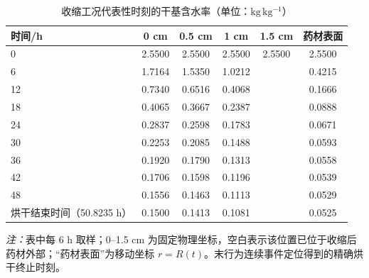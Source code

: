\begin{table}[htbp]
\centering
\caption{收缩工况代表性时刻的干基含水率（单位：$\mathrm{kg\,kg^{-1}}$）}
\label{tab:t6}
\begin{tabular}{lccccc}
\toprule
时间/h & 0 cm & 0.5 cm & 1 cm & 1.5 cm & 药材表面 \\
\midrule
0 & 2.5500 & 2.5500 & 2.5500 & 2.5500 & 2.5500 \\
6 & 1.7164 & 1.5350 & 1.0212 &  & 0.4215 \\
12 & 0.7340 & 0.6516 & 0.4068 &  & 0.1666 \\
18 & 0.4065 & 0.3667 & 0.2387 &  & 0.0888 \\
24 & 0.2837 & 0.2598 & 0.1783 &  & 0.0671 \\
30 & 0.2253 & 0.2085 & 0.1488 &  & 0.0593 \\
36 & 0.1920 & 0.1790 & 0.1313 &  & 0.0558 \\
42 & 0.1706 & 0.1598 & 0.1196 &  & 0.0539 \\
48 & 0.1556 & 0.1463 & 0.1113 &  & 0.0529 \\
烘干结束时间（50.8235 h） & 0.1500 & 0.1413 & 0.1081 &  & 0.0525 \\
\bottomrule
\end{tabular}
\parbox{0.88\linewidth}{\footnotesize\textit{注：}表中每 6 h 取样；0--1.5 cm 为固定物理坐标，空白表示该位置已位于收缩后药材外部；“药材表面”为移动坐标 $r=R(t)$。末行为连续事件定位得到的精确烘干终止时刻。}
\end{table}
